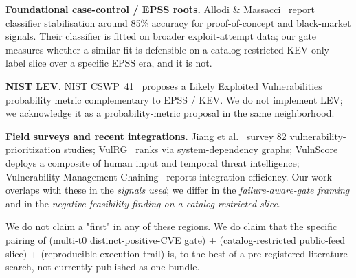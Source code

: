 \textbf{Foundational case-control / EPSS roots.} Allodi \& Massacci~\cite{AllodiMassacci2014CaseControl} report classifier stabilisation around 85\% accuracy for proof-of-concept and black-market signals. Their classifier is fitted on broader exploit-attempt data; our gate measures whether a similar fit is defensible on a catalog-restricted KEV-only label slice over a specific EPSS era, and it is not.

\textbf{NIST LEV.} NIST CSWP~41~\cite{MellSpring2025NISTLEV} proposes a Likely Exploited Vulnerabilities probability metric complementary to EPSS / KEV. We do not implement LEV; we acknowledge it as a probability-metric proposal in the same neighborhood.

\textbf{Field surveys and recent integrations.} Jiang et al.~\cite{Jiang2025Survey} survey 82 vulnerability-prioritization studies; VulRG~\cite{VulRG2025} ranks via system-dependency graphs; VulnScore~\cite{AlqahtaniAlmukaynizi2025VulnScore} deploys a composite of human input and temporal threat intelligence; Vulnerability Management Chaining~\cite{VMChaining2025} reports integration efficiency. Our work overlaps with these in the \emph{signals used}; we differ in the \emph{failure-aware-gate framing} and in the \emph{negative feasibility finding on a catalog-restricted slice}.

We do not claim a "first" in any of these regions. We do claim that the specific pairing of (multi-t0 distinct-positive-CVE gate) + (catalog-restricted public-feed slice) + (reproducible execution trail) is, to the best of a pre-registered literature search, not currently published as one bundle.
